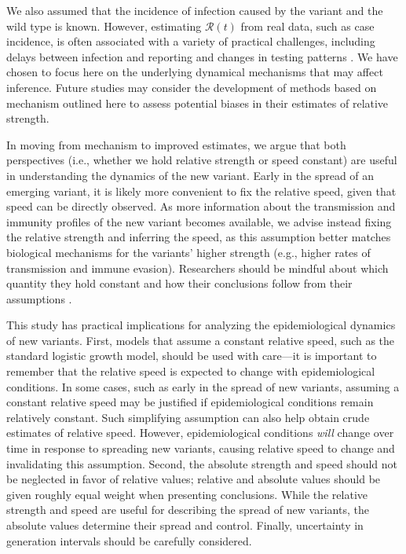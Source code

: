 \documentclass[12pt]{article}
\newcommand{\RR}{\ensuremath{{\mathcal R}}\xspace}
\begin{document}
We also assumed that the incidence of infection caused by the variant and the wild type is known.
However, estimating $\RR(t)$ from real data, such as case incidence, is often associated with a variety of practical challenges, including delays between infection and reporting and changes in testing patterns \citep{gostic2020practical}.
We have chosen to focus here on the underlying dynamical mechanisms that may affect inference.
Future studies may consider the development of methods based on mechanism outlined here to assess potential biases in their estimates of relative strength. 

In moving from mechanism to improved estimates, we argue that both perspectives (i.e., whether we hold relative strength or speed constant) are useful in understanding the dynamics of the new variant.
Early in the spread of an emerging variant, it is likely more convenient to fix the relative speed, given that speed can be directly observed.
As more information about the transmission and immunity profiles of the new variant becomes available, we advise instead fixing the relative strength and inferring the speed, as this assumption better matches biological mechanisms for the variants' higher strength (e.g., higher rates of transmission and immune evasion).
Researchers should be mindful about which quantity they hold constant and how their conclusions follow from their assumptions \citep{doi:10.1098/rspb.2020.1556}.

This study has practical implications for analyzing the epidemiological dynamics of new variants.
First, models that assume a constant relative speed, such as the standard logistic growth model, should be used with care---it is important to remember that the relative speed is expected to change with epidemiological conditions.
In some cases, such as early in the spread of new variants, assuming a constant relative speed may be justified if epidemiological conditions remain relatively constant. 
Such simplifying assumption can also help obtain crude estimates of relative speed. 
However, epidemiological conditions \textit{will} change over time in response to spreading new variants, causing relative speed to change and invalidating this assumption.
Second, the absolute strength and speed should not be neglected in favor of relative values; relative and absolute values should be given roughly equal weight when presenting conclusions.
While the relative strength and speed are useful for describing the spread of new variants, the absolute values determine their spread and control.
Finally, uncertainty in generation intervals should be carefully considered.
\end{document}
